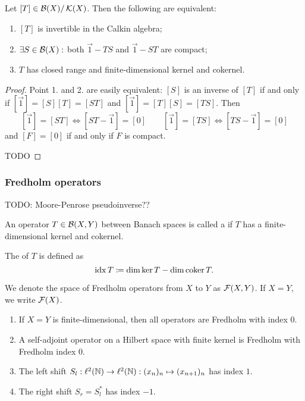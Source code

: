 \begin{proposition}
Let $[T]\in\operatorname{\mathcal{B}}(X)/\operatorname{\mathcal{K}}(X)$. Then the following are equivalent:
\begin{enumerate}
\item $[T]$ is invertible in the Calkin algebra;
\item $\exists S\in\operatorname{\mathcal{B}}(X):$ both $\vec{1}-TS$ and $\vec{1}-ST$ are compact;
\item $T$ has closed range and finite-dimensional kernel and cokernel. 
\end{enumerate}
\end{proposition}
\begin{proof}
Point 1. and 2. are easily equivalent: $[S]$ is an inverse of $[T]$ if and only if $[\vec{1}] = [S][T] = [ST]$ and $[\vec{1}] = [T][S] = [TS]$. Then
\[ [\vec{1}] = [ST] \iff [ST - \vec{1}] = [0] \qquad [\vec{1}] = [TS] \iff [TS - \vec{1}] = [0] \]
and $[F]=[0]$ if and only if $F$ is compact.

TODO
\end{proof}

\subsubsection{Fredholm operators}
TODO: Moore-Penrose pseudoinverse??

\begin{definition}
An operator $T\in\operatorname{\mathcal{B}}(X,Y)$ between Banach spaces is called a  if $T$ has a finite-dimensional kernel and cokernel.

The  of $T$ is defined as
\[ \operatorname{idx} T \coloneqq \dim\ker T - \dim\operatorname{coker} T.  \]

We denote the space of Fredholm operators from $X$ to $Y$ as $\operatorname{\mathcal{F}}(X,Y)$. If $X=Y$, we write $\operatorname{\mathcal{F}}(X)$.
\end{definition}

\begin{example}
\begin{enumerate}
\item If $X=Y$ is finite-dimensional, then all operators are Fredholm with index $0$.
\item A self-adjoint operator on a Hilbert space with finite kernel is Fredholm with Fredholm index $0$.
\item The left shift $S_l:\ell^2(\mathbb{N})\to\ell^2(\mathbb{N}): (x_n)_n\mapsto (x_{n+1})_n$ has index $1$.
\item The right shift $S_r = S_l^*$ has index $-1$.
\end{enumerate}
\end{example}

